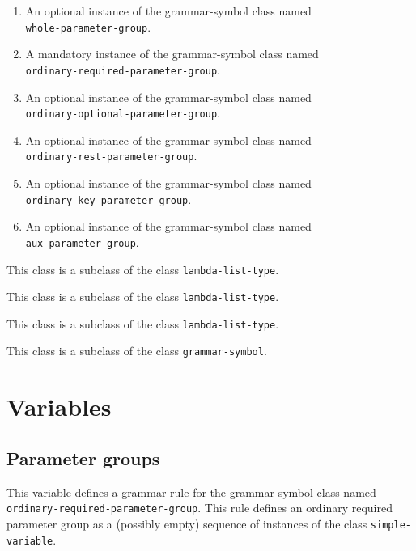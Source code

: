 \begin{enumerate}
\item An optional instance of the grammar-symbol class named\\
  \texttt{whole-parameter-group}.
\item A mandatory instance of the grammar-symbol class named\\
  \texttt{ordinary-required-parameter-group}.
\item An optional instance of the grammar-symbol class named\\
  \texttt{ordinary-optional-parameter-group}.
\item An optional instance of the grammar-symbol class named\\
\texttt{ordinary-rest-parameter-group}.
\item An optional instance of the grammar-symbol class named\\
\texttt{ordinary-key-parameter-group}.
\item An optional instance of the grammar-symbol class named\\
\texttt{aux-parameter-group}.
\end{enumerate}

This class is a subclass of the class \texttt{lambda-list-type}.


This class is a subclass of the class \texttt{lambda-list-type}.


This class is a subclass of the class \texttt{lambda-list-type}.


This class is a subclass of the class \texttt{grammar-symbol}.

\section{Variables}

\subsection{Parameter groups}


This variable defines a grammar rule for the grammar-symbol class
named \texttt{ordinary-required-parameter-group}.  This rule defines
an ordinary required parameter group as a (possibly empty) sequence of
instances of the class \texttt{simple-variable}.

